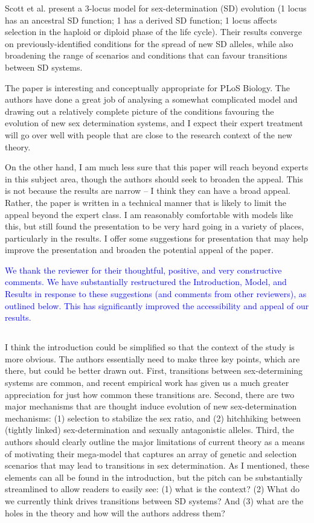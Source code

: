 \documentclass[10pt,letterpaper]{article}
\begin{document}
Scott et al. present a 3-locus model for sex-determination (SD) evolution (1 locus has an ancestral SD function; 1 has a derived SD function; 1 locus affects selection in the haploid or diploid phase of the life cycle). Their results converge on previously-identified conditions for the spread of new SD alleles, while also broadening the range of scenarios and conditions that can favour transitions between SD systems.

The paper is interesting and conceptually appropriate for PLoS Biology. The authors have done a great job of analysing a somewhat complicated model and drawing out a relatively complete picture of the conditions favouring the evolution of new sex determination systems, and I expect their expert treatment will go over well with people that are close to the research context of the new theory.

On the other hand, I am much less sure that this paper will reach beyond experts in this subject area, though the authors should seek to broaden the appeal. This is not because the results are narrow -- I think they can have a broad appeal. Rather, the paper is written in a technical manner that is likely to limit the appeal beyond the expert class. I am reasonably comfortable with models like this, but still found the presentation to be very hard going in a variety of places, particularly in the results. I offer some suggestions for presentation that may help improve the presentation and broaden the potential appeal of the paper.

\textcolor{blue}{
We thank the reviewer for their thoughtful, positive, and very constructive comments. We have substantially restructured the Introduction, Model, and Results in response to these suggestions (and comments from other reviewers), as outlined below. 
This has significantly improved the accessibility and appeal of our results. 
}

\noindent\subsection{}
I think the introduction could be simplified so that the context of the study is more obvious. The authors essentially need to make three key points, which are there, but could be better drawn out. First, transitions between sex-determining systems are common, and recent empirical work has given us a much greater appreciation for just how common these transitions are. Second, there are two major mechanisms that are thought induce evolution of new sex-determination mechanisms: (1) selection to stabilize the sex ratio, and (2) hitchhiking between (tightly linked) sex-determination and sexually antagonistic alleles. Third, the authors should clearly outline the major limitations of current theory as a means of motivating their mega-model that captures an array of genetic and selection scenarios that may lead to transitions in sex determination. As I mentioned, these elements can all be found in the introduction, but the pitch can be substantially streamlined to allow readers to easily see: (1) what is the context? (2) What do we currently think drives transitions between SD systems? And (3) what are the holes in the theory and how will the authors address them?
\end{document}
